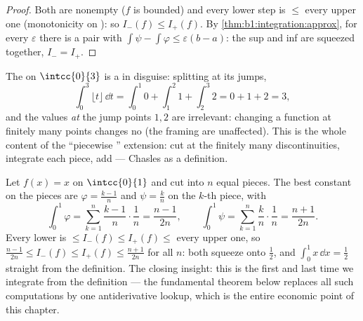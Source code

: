 \begin{proof}
Both  are nonempty ($f$ is bounded) and every lower step 
is $\leq$ every upper one (monotonicity on ): so
$I_-(f) \leq I_+(f)$. By \cref{thm:b1:integration:approx}, for every
$\varepsilon$ there is a pair with $\int\psi - \int\varphi \leq
\varepsilon(b - a)$: the sup and inf are squeezed together, $I_- =
I_+$.
\end{proof}

\begin{example}\label{ex:b1:integration:piecewise}
The  on $\intcc{0}{3}$ is a  in
disguise: splitting at its jumps,
\[
\int_0^3 \lfloor t \rfloor\,\dd t
= \int_0^1 0 + \int_1^2 1 + \int_2^3 2 = 0 + 1 + 2 = 3 ,
\]
and the values \emph{at} the jump points $1, 2$ are irrelevant:
changing a function at finitely many points changes no 
(the framing  are unaffected). This is the whole
content of the ``piecewise '' extension: cut at the
finitely many discontinuities, integrate each  piece,
add --- Chasles as a definition.
\end{example}

\begin{example}\label{ex:b1:integration:defcompute}
Let $f(x) = x$ on $\intcc{0}{1}$ and cut into $n$ equal pieces.
The best  constant on the pieces are $\varphi =
\frac{k-1}{n}$ and $\psi = \frac kn$ on the $k$-th piece, with
\[
\int_0^1 \varphi = \sum_{k=1}^{n} \frac{k-1}{n}\cdot\frac1n
= \frac{n-1}{2n},
\qquad
\int_0^1 \psi = \sum_{k=1}^{n} \frac{k}{n}\cdot\frac1n
= \frac{n+1}{2n} .
\]
Every lower  is $\leq I_-(f) \leq I_+(f) \leq$ every
upper one, so $\frac{n-1}{2n} \leq I_-(f) \leq I_+(f) \leq
\frac{n+1}{2n}$ for all $n$: both squeeze onto $\frac12$, and
$\int_0^1 x\,\dd x = \frac12$ straight from the definition. The
closing insight: this is the first and last time we integrate
from the definition --- the fundamental theorem below replaces
all such computations by one antiderivative lookup, which is
the entire economic point of this chapter.
\end{example}

